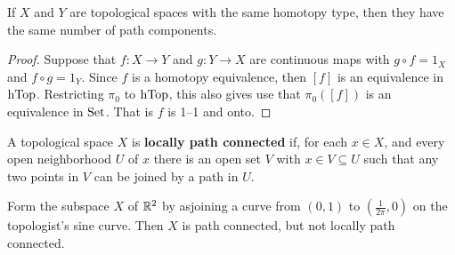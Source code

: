 \begin{corollary}
    If $X$ and  $Y$ are topological spaces with the same homotopy type, then
    they have the same number of path components.
\end{corollary}
\begin{proof}
    Suppose that $f:X \xrightarrow{} Y$ and $g:Y \xrightarrow{} X$ are
    continuous maps with $g \circ f=1_X$ and  $f \circ g=1_Y$. Since $f$ is a
    homotopy equivalence, then  $[f]$ is an equivalence in $\operatorname{hTop}$. Restricting
     $\pi_0$ to $\operatorname{hTop}$, this also gives use that $\pi_0([f])$ is an equivalence
     in $\operatorname{Set}$. That is  $f$ is 1--1 and onto.
\end{proof}

\begin{definition}
    A topological space $X$ is  \textbf{locally path connected} if, for each $x
    \in X$, and every open neighborhood $U$ of  $x$ there is an open set $V$
    with  $x \in V \subseteq U$ such that any two points in  $V$ can be joined
    by a path in $U$.
\end{definition}

\begin{example}\label{2.10}
    Form the subspace $X$ of $\mathbb{R}^2$ by asjoining a curve from  $(0,1)$ to
    $(\frac{1}{2\pi}, 0)$ on the topologist's sine curve. Then  $X$ is path
    connected, but not locally path connected.
\end{example}

